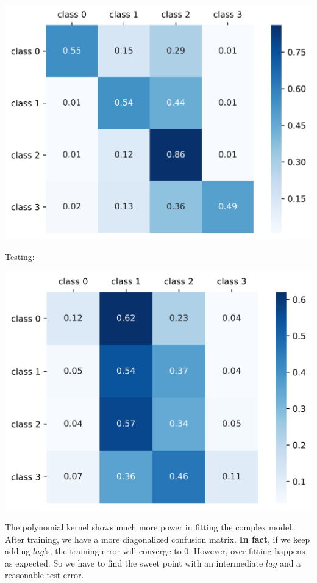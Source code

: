 \documentclass[9pt,twocolumn,twoside]{ilcss}
\begin{document}
\begin{center}
\includegraphics[scale=0.35]{train_cfs_mat_5_poly.png}
\end{center}
Testing:

\begin{center}
\includegraphics[scale=0.35]{test_cfs_mat_5_poly.png}
\end{center}

The polynomial kernel shows much more power in fitting the complex model. After training, we have a more diagonalized confusion matrix. \textbf{In fact}, if we keep adding $lag$'s, the training error will converge to $0$. However, over-fitting happens as expected. So we have to find the sweet point with an intermediate $lag$ and a reasonable test error.
\end{document}
